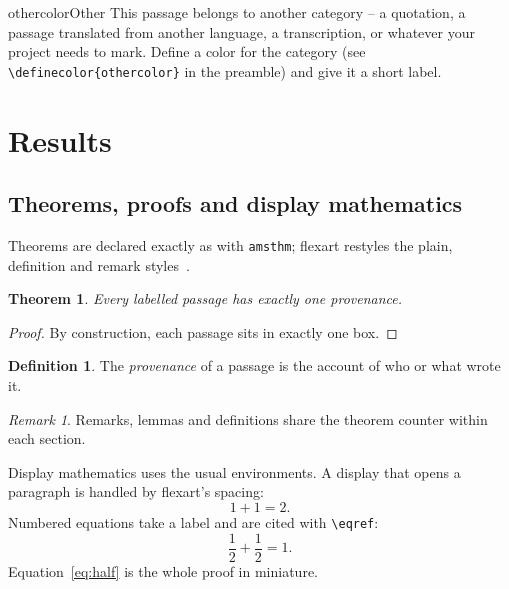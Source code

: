 \documentclass[11pt]{article}
\theoremstyle{plain}
\newtheorem{theorem}{Theorem}[section]
\theoremstyle{definition}
\newtheorem{definition}{Definition}[section]
\theoremstyle{remark}
\newtheorem{remark}{Remark}[section]
\begin{document}
\begin{labeledblock}{othercolor}{Other}
This passage belongs to another category -- a quotation, a passage
translated from another language, a transcription, or whatever your
project needs to mark. Define a color for the category (see
\texttt{\textbackslash definecolor\{othercolor\}} in the preamble) and
give it a short label.
\end{labeledblock}


\section{Results}

\subsection{Theorems, proofs and display mathematics}

Theorems are declared exactly as with \texttt{amsthm}; flexart restyles
the plain, definition and remark styles~\cite{flexart2026}.

\begin{theorem}
\label{thm:main}
Every labelled passage has exactly one provenance.
\end{theorem}

\begin{proof}
By construction, each passage sits in exactly one box.
\end{proof}

\begin{definition}
\label{def:provenance}
The \emph{provenance} of a passage is the account of who or what wrote it.
\end{definition}

\begin{remark}
Remarks, lemmas and definitions share the theorem counter within each
section.
\end{remark}

Display mathematics uses the usual environments. A display that opens a
paragraph is handled by flexart's spacing:
\[
  1 + 1 = 2.
\]
Numbered equations take a label and are cited with \verb|\eqref|:
\begin{equation}
  \label{eq:half}
  \frac{1}{2} + \frac{1}{2} = 1.
\end{equation}
Equation~\eqref{eq:half} is the whole proof in miniature.
\end{document}
